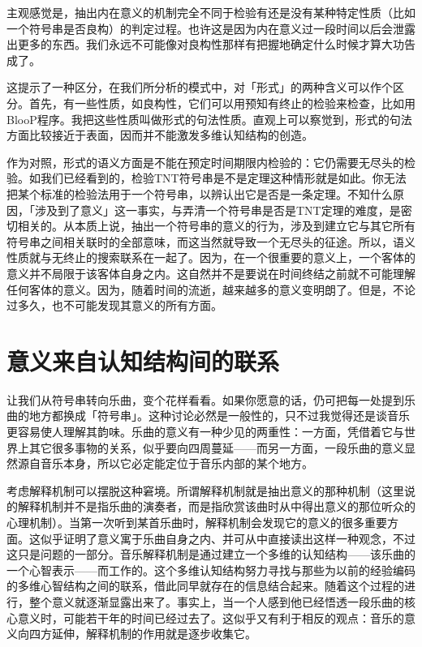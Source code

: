 \documentclass[
  12pt,
  twoside,
  openright,
  oldfontcommands,
]{memoir}
\begin{document}
主观感觉是，抽出内在意义的机制完全不同于检验有还是没有某种特定性质（比如一个符号串是否良构）的判定过程。也许这是因为内在意义过一段时间以后会泄露出更多的东西。我们永远不可能像对良构性那样有把握地确定什么时候才算大功告成了。

这提示了一种区分，在我们所分析的模式中，对「形式」的两种含义可以作个区分。首先，有一些性质，如良构性，它们可以用预知有终止的检验来检查，比如用BlooP程序。我把这些性质叫做形式的句法性质。直观上可以察觉到，形式的句法方面比较接近于表面，因而并不能激发多维认知结构的创造。

作为对照，形式的语义方面是不能在预定时间期限内检验的：它仍需要无尽头的检验。如我们已经看到的，检验TNT符号串是不是定理这种情形就是如此。你无法把某个标准的检验法用于一个符号串，以辨认出它是否是一条定理。不知什么原因，「涉及到了意义」这一事实，与弄清一个符号串是否是TNT定理的难度，是密切相关的。从本质上说，抽出一个符号串的意义的行为，涉及到建立它与其它所有符号串之间相关联时的全部意味，而这当然就导致一个无尽头的征途。所以，语义性质就与无终止的搜索联系在一起了。因为，在一个很重要的意义上，一个客体的意义并不局限于该客体自身之内。这自然并不是要说在时间终结之前就不可能理解任何客体的意义。因为，随着时间的流逝，越来越多的意义变明朗了。但是，不论过多久，也不可能发现其意义的所有方面。

\section{意义来自认知结构间的联系}

让我们从符号串转向乐曲，变个花样看看。如果你愿意的话，仍可把每一处提到乐曲的地方都换成「符号串」。这种讨论必然是一般性的，只不过我觉得还是谈音乐更容易使人理解其韵味。乐曲的意义有一种少见的两重性：一方面，凭借着它与世界上其它很多事物的关系，似乎要向四周蔓延------而另一方面，一段乐曲的意义显然源自音乐本身，所以它必定能定位于音乐内部的某个地方。

考虑解释机制可以摆脱这种窘境。所谓解释机制就是抽出意义的那种机制（这里说的解释机制并不是指乐曲的演奏者，而是指欣赏该曲时从中得出意义的那位听众的心理机制）。当第一次听到某首乐曲时，解释机制会发现它的意义的很多重要方面。这似乎证明了意义寓于乐曲自身之内、并可从中直接读出这样一种观念，不过这只是问题的一部分。音乐解释机制是通过建立一个多维的认知结构------该乐曲的一个心智表示------而工作的。这个多维认知结构努力寻找与那些为以前的经验编码的多维心智结构之间的联系，借此同早就存在的信息结合起来。随着这个过程的进行，整个意义就逐渐显露出来了。事实上，当一个人感到他已经悟透一段乐曲的核心意义时，可能若干年的时间已经过去了。这似乎又有利于相反的观点：音乐的意义向四方延伸，解释机制的作用就是逐步收集它。
\end{document}
